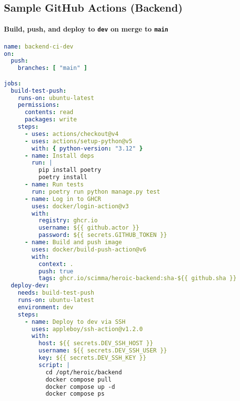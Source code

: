\documentclass[11pt]{article}
\begin{document}
\subsection*{Sample GitHub Actions (Backend)}
\paragraph{Build, push, and deploy to \texttt{dev} on merge to \texttt{main}}
\begin{lstlisting}[language=YAML]
name: backend-ci-dev
on:
  push:
    branches: [ "main" ]

jobs:
  build-test-push:
    runs-on: ubuntu-latest
    permissions:
      contents: read
      packages: write
    steps:
      - uses: actions/checkout@v4
      - uses: actions/setup-python@v5
        with: { python-version: "3.12" }
      - name: Install deps
        run: |
          pip install poetry
          poetry install
      - name: Run tests
        run: poetry run python manage.py test
      - name: Log in to GHCR
        uses: docker/login-action@v3
        with:
          registry: ghcr.io
          username: ${{ github.actor }}
          password: ${{ secrets.GITHUB_TOKEN }}
      - name: Build and push image
        uses: docker/build-push-action@v6
        with:
          context: .
          push: true
          tags: ghcr.io/scimma/heroic-backend:sha-${{ github.sha }}
  deploy-dev:
    needs: build-test-push
    runs-on: ubuntu-latest
    environment: dev
    steps:
      - name: Deploy to dev via SSH
        uses: appleboy/ssh-action@v1.2.0
        with:
          host: ${{ secrets.DEV_SSH_HOST }}
          username: ${{ secrets.DEV_SSH_USER }}
          key: ${{ secrets.DEV_SSH_KEY }}
          script: |
            cd /opt/heroic/backend
            docker compose pull
            docker compose up -d
            docker compose ps
\end{lstlisting}
\end{document}
